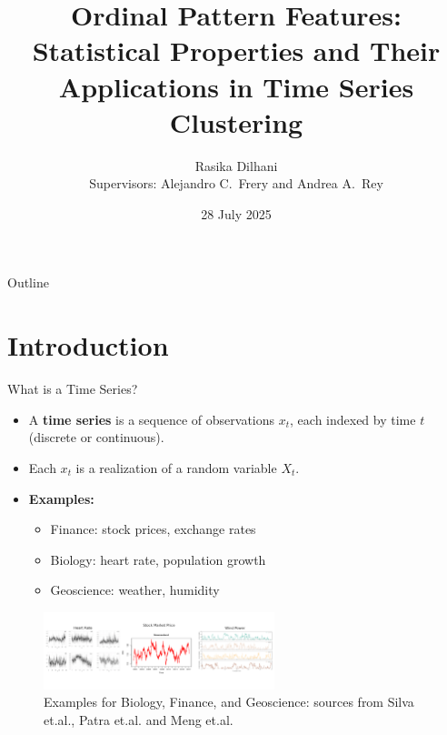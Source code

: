 \documentclass{beamer}
\title{Ordinal Pattern Features: Statistical Properties and Their Applications in Time Series Clustering}
\author[Rasika Dilhani]{{Rasika Dilhani}\\{\small Supervisors: Alejandro C.\ Frery and Andrea A.\ Rey}}
\institute[VUW]{Victoria University of Wellington}
\date{28 July 2025}
\begin{document}
\maketitle
\begin{frame}{Outline}
    \tableofcontents
\end{frame}

\section{Introduction}

\begin{frame}{What is a Time Series?}
	\begin{itemize}
		\item A \textbf{time series} is a sequence of observations $x_t$, each indexed by time $t$ (discrete or continuous).
		\item Each $x_t$ is a realization of a random variable $X_t$.
		\item \textbf{Examples:}
		\begin{itemize}
			\item Finance: stock prices, exchange rates
			\item Biology: heart rate, population growth
			\item Geoscience: weather, humidity
		\end{itemize}
		\end{itemize}
		\begin{figure}[hbt]
			\centering
			\includegraphics[width=0.6\textwidth]{time series plots}
			\caption{Examples for Biology, Finance, and Geoscience: sources from Silva et.al., Patra et.al. and Meng et.al.~\cite{Silva2023,Patra2022,Meng2023}}
			\label{fig:timeseries}
		\end{figure}	
\end{frame}
\end{document}
